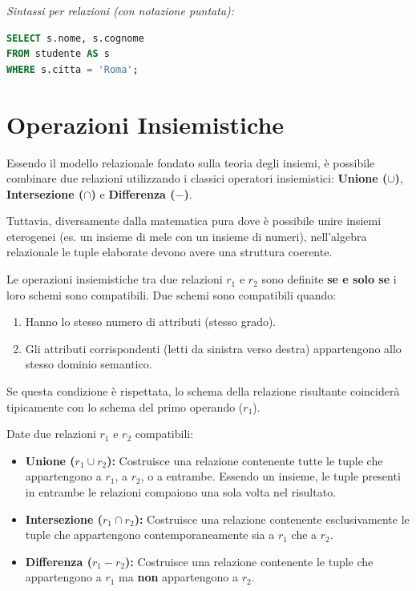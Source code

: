 \textit{Sintassi per relazioni (con notazione puntata):}
\begin{lstlisting}[language=SQL, basicstyle=\ttfamily\small, keywordstyle=\color{blue}\bfseries]
SELECT s.nome, s.cognome
FROM studente AS s
WHERE s.citta = 'Roma';
\end{lstlisting}

\section{Operazioni Insiemistiche}

Essendo il modello relazionale fondato sulla teoria degli insiemi, è possibile combinare due relazioni utilizzando i classici operatori insiemistici: \textbf{Unione ($\cup$)}, \textbf{Intersezione ($\cap$)} e \textbf{Differenza ($-$)}.

Tuttavia, diversamente dalla matematica pura dove è possibile unire insiemi eterogenei (es. un insieme di mele con un insieme di numeri), nell'algebra relazionale le tuple elaborate devono avere una struttura coerente.

\begin{warningbox}
Le operazioni insiemistiche tra due relazioni $r_1$ e $r_2$ sono definite \textbf{se e solo se} i loro schemi sono compatibili. Due schemi sono compatibili quando:
\begin{enumerate}
    \item Hanno lo stesso numero di attributi (stesso grado).
    \item Gli attributi corrispondenti (letti da sinistra verso destra) appartengono allo stesso dominio semantico.
\end{enumerate}
Se questa condizione è rispettata, lo schema della relazione risultante coinciderà tipicamente con lo schema del primo operando ($r_1$).
\end{warningbox}

Date due relazioni $r_1$ e $r_2$ compatibili:
\begin{itemize}
    \item \textbf{Unione ($r_1 \cup r_2$):} Costruisce una relazione contenente tutte le tuple che appartengono a $r_1$, a $r_2$, o a entrambe. Essendo un insieme, le tuple presenti in entrambe le relazioni compaiono una sola volta nel risultato.
    \item \textbf{Intersezione ($r_1 \cap r_2$):} Costruisce una relazione contenente esclusivamente le tuple che appartengono contemporaneamente sia a $r_1$ che a $r_2$.
    \item \textbf{Differenza ($r_1 - r_2$):} Costruisce una relazione contenente le tuple che appartengono a $r_1$ ma \textbf{non} appartengono a $r_2$.
\end{itemize}

